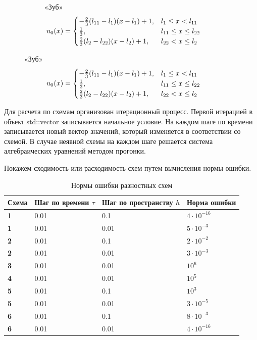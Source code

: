 \documentclass[12pt, a4paper]{article}
\begin{document}
\begin{figure}[!hp]
\begin{subfigure}[t]{0.475\textwidth}
		\captionsetup{singlelinecheck=off}
		\caption[]{«Зуб»
			\[
			\hspace*{-0.75cm}u_0(x) =
			\begin{cases}
				-\frac{2}{3} (l_{11} - l_1) (x - l_1) + 1, & l_1 \leq x < l_{11} \\
				\frac{1}{3}, & l_{11} \leq x \leq l_{22} \\
				\frac{2}{3} (l_2 - l_{22}) (x - l_2) + 1, & l_{22} < x \leq l_2
			\end{cases}
			\]
		}
		\label{test5}
	\end{subfigure}
\end{figure}

 Для расчета по схемам организован итерационный процесс. Первой итерацией в объект std::vector записывается начальное условие. На каждом шаге по времени записывается новый вектор значений, который изменяется в соответствии со схемой. В случае неявной схемы на каждом шаге решается система алгебраических уравнений методом прогонки. 

Покажем сходимость или расходимость схем путем вычисления нормы ошибки.

\begin{table}[ht!]
	\caption{Нормы ошибки разностных схем}
	\centering
	\begin{tabular}{|l|l|l|l|}
		\hline
		Схема       & Шаг по времени $\tau$  & Шаг по пространству $h$ & Норма ошибки           \\ \hline
		\textbf{1}  & 0.01                    & 0.1    				   &  $4 \cdot 10^{-16} $   \\ \hline
		\textbf{1}  & 0.01                    & 0.01   			       &  $5 \cdot 10^{-3} $    \\ \hline
		\textbf{2}  & 0.01                   & 0.1   				   &  $2 \cdot 10^{-2} $    \\ \hline 
		\textbf{2}  & 0.01     		     	 & 0.01  				   &  $3 \cdot 10^{-3} $    \\ \hline
		\textbf{3}  & 0.01   		         & 0.01  				   &  $  10^{6} $           \\ \hline
		\textbf{4}  & 0.01     		     	 & 0.01  				   &  $  10^{5} $           \\ \hline
		\textbf{5}  & 0.01     		    	 & 0.1  				   &  $ 10^{3}  $           \\ \hline
		\textbf{5}  & 0.01    		         & 0.01  				   &  $3 \cdot 10^{-5} $    \\ \hline
		\textbf{6}  & 0.01     		    	 & 0.1  				   &  $8 \cdot 10^{-3} $    \\ \hline
		\textbf{6}  & 0.01     		    	 & 0.01  				   & $4 \cdot 10^{-16} $    \\ \hline
	\end{tabular}
\end{table}
\end{document}
